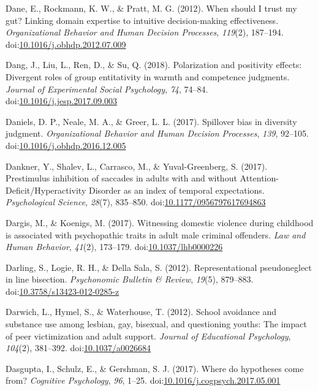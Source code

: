 \documentclass[english,man]{apa6}
\theoremstyle{definition}
\theoremstyle{definition}
\theoremstyle{definition}
\theoremstyle{remark}
\begin{document}
\hypertarget{ref-Dane2012}{}
Dane, E., Rockmann, K. W., \& Pratt, M. G. (2012). When should I trust
my gut? Linking domain expertise to intuitive decision-making
effectiveness. \emph{Organizational Behavior and Human Decision
Processes}, \emph{119}(2), 187--194.
doi:\href{https://doi.org/10.1016/j.obhdp.2012.07.009}{10.1016/j.obhdp.2012.07.009}

\hypertarget{ref-Dang2018}{}
Dang, J., Liu, L., Ren, D., \& Su, Q. (2018). Polarization and
positivity effects: Divergent roles of group entitativity in warmth and
competence judgments. \emph{Journal of Experimental Social Psychology},
\emph{74}, 74--84.
doi:\href{https://doi.org/10.1016/j.jesp.2017.09.003}{10.1016/j.jesp.2017.09.003}

\hypertarget{ref-Daniels2017}{}
Daniels, D. P., Neale, M. A., \& Greer, L. L. (2017). Spillover bias in
diversity judgment. \emph{Organizational Behavior and Human Decision
Processes}, \emph{139}, 92--105.
doi:\href{https://doi.org/10.1016/j.obhdp.2016.12.005}{10.1016/j.obhdp.2016.12.005}

\hypertarget{ref-Dankner2017}{}
Dankner, Y., Shalev, L., Carrasco, M., \& Yuval-Greenberg, S. (2017).
Prestimulus inhibition of saccades in adults with and without
Attention-Deficit/Hyperactivity Disorder as an index of temporal
expectations. \emph{Psychological Science}, \emph{28}(7), 835--850.
doi:\href{https://doi.org/10.1177/0956797617694863}{10.1177/0956797617694863}

\hypertarget{ref-Dargis2017}{}
Dargis, M., \& Koenigs, M. (2017). Witnessing domestic violence during
childhood is associated with psychopathic traits in adult male criminal
offenders. \emph{Law and Human Behavior}, \emph{41}(2), 173--179.
doi:\href{https://doi.org/10.1037/lhb0000226}{10.1037/lhb0000226}

\hypertarget{ref-Darling2012}{}
Darling, S., Logie, R. H., \& Della Sala, S. (2012). Representational
pseudoneglect in line bisection. \emph{Psychonomic Bulletin \& Review},
\emph{19}(5), 879--883.
doi:\href{https://doi.org/10.3758/s13423-012-0285-z}{10.3758/s13423-012-0285-z}

\hypertarget{ref-Darwich2012}{}
Darwich, L., Hymel, S., \& Waterhouse, T. (2012). School avoidance and
substance use among lesbian, gay, bisexual, and questioning youths: The
impact of peer victimization and adult support. \emph{Journal of
Educational Psychology}, \emph{104}(2), 381--392.
doi:\href{https://doi.org/10.1037/a0026684}{10.1037/a0026684}

\hypertarget{ref-Dasgupta2017}{}
Dasgupta, I., Schulz, E., \& Gershman, S. J. (2017). Where do hypotheses
come from? \emph{Cognitive Psychology}, \emph{96}, 1--25.
doi:\href{https://doi.org/10.1016/j.cogpsych.2017.05.001}{10.1016/j.cogpsych.2017.05.001}
\end{document}
